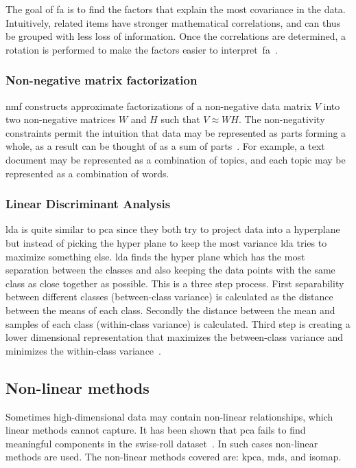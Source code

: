The goal of \gls{fa} is to find the factors that explain the most covariance in the data. Intuitively, related items have stronger mathematical correlations, and can thus be grouped with less loss of information. Once the correlations are determined, a rotation is performed to make the factors easier to interpret~\gls{fa}~\cite{decoster-1998-factor-analysis-overview}.


\subsubsection{Non-negative matrix factorization}\label{subsubsec:non-negative-matrix-factorization}
\gls{nmf} constructs approximate factorizations of a non-negative data matrix $V$ into two non-negative matrices $W$ and $H$ such that $V \approx WH$. The non-negativity constraints permit the intuition that data may be represented as parts forming a whole, as a result can be thought of as a sum of parts~\cite{lee-1999-learning-nmf}. For example, a text document may be represented as a combination of topics, and each topic may be represented as a combination of words.


\subsubsection{Linear Discriminant Analysis}\label{subsubsec:linear-discriminant-analysis}

\gls{lda} is quite similar to \gls{pca} since they both try to project data into a hyperplane but instead of picking the hyper plane to keep the most variance \gls{lda} tries to maximize something else. \gls{lda} finds the hyper plane which has the most separation between the classes and also keeping the data points with the same class as close together as possible. This is a three step process. First separability between different classes (between-class variance) is calculated as the distance between the means of each class. Secondly the distance between the mean and samples of each class (within-class variance) is calculated. Third step is creating a lower dimensional representation that maximizes the between-class variance and minimizes the within-class variance~\cite{linear-discriminant-analysis-tutorial}.


\subsection{Non-linear methods}\label{subsec:non-linear-methods}
Sometimes high-dimensional data may contain non-linear relationships, which linear methods cannot capture. It has been shown that \gls{pca} fails to find meaningful components in the swiss-roll dataset~\cite{tennenbaum}. In such cases non-linear methods are used. The non-linear methods covered are: \gls{kpca}, \gls{mds}, and \gls{isomap}.




